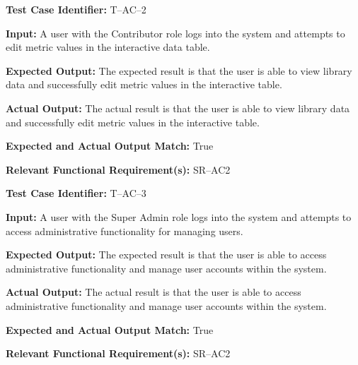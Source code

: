 \documentclass[12pt, titlepage]{article}
\begin{document}
\begin{mdframed}[linewidth=0.5mm]
\setlength{\parindent}{0pt}
\textbf{Test Case Identifier:} T--AC--2
\vspace{0.4em}

\textbf{Input:} A user with the Contributor role logs into the system and attempts to edit metric values in the interactive data table.
\vspace{0.4em}

\textbf{Expected Output:} The expected result is that the user is able to view library data and successfully edit metric values in the interactive table.
\vspace{0.4em}

\textbf{Actual Output:} The actual result is that the user is able to view library data and successfully edit metric values in the interactive table.
\vspace{0.4em}

\textbf{Expected and Actual Output Match:} True
\vspace{0.4em}

\textbf{Relevant Functional Requirement(s):} SR--AC2
\end{mdframed}

\begin{mdframed}[linewidth=0.5mm]
\setlength{\parindent}{0pt}
\textbf{Test Case Identifier:} T--AC--3
\vspace{0.4em}

\textbf{Input:} A user with the Super Admin role logs into the system and attempts to access administrative functionality for managing users.
\vspace{0.4em}

\textbf{Expected Output:} The expected result is that the user is able to access administrative functionality and manage user accounts within the system.
\vspace{0.4em}

\textbf{Actual Output:} The actual result is that the user is able to access administrative functionality and manage user accounts within the system.
\vspace{0.4em}

\textbf{Expected and Actual Output Match:} True
\vspace{0.4em}

\textbf{Relevant Functional Requirement(s):} SR--AC2
\end{mdframed}
\end{document}

